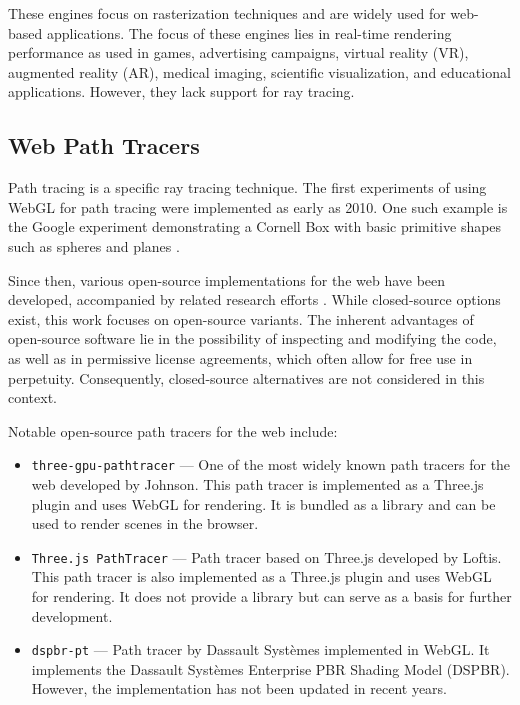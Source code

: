 These engines focus on rasterization techniques and are widely used for web-based applications. The focus of these engines lies in real-time rendering performance as used in games, advertising campaigns, virtual reality (VR), augmented reality (AR), medical imaging, scientific visualization, and educational applications. However, they lack support for ray tracing.

\subsection*{Web Path Tracers}
\label{sec:web-path-tracers}

Path tracing is a specific ray tracing technique. The first experiments of using \gls{WebGL} for path tracing were implemented as early as 2010. One such example is the Google experiment demonstrating a Cornell Box \cite{goral1984modeling} with basic primitive shapes such as spheres and planes \cite{pathTracerWallace}.

Since then, various open-source implementations for the web have been developed, accompanied by related research efforts \cite{academicWebGLPathTracer, academicWebGLPathTracer2}. While closed-source options exist, this work focuses on open-source variants. The inherent advantages of open-source software lie in the possibility of inspecting and modifying the code, as well as in permissive license agreements, which often allow for free use in perpetuity. Consequently, closed-source alternatives are not considered in this context.

Notable open-source path tracers for the web include:

\begin{itemize}
  \item{\texttt{three-gpu-pathtracer}} \cite{ThreeJsPathTracerJohnson} — One of the most widely known path tracers for the web developed by Johnson. This path tracer is implemented as a \gls{Three.js} plugin and uses \gls{WebGL} for rendering.  It is bundled as a library and can be used to render scenes in the browser.
  \item{\texttt{Three.js PathTracer}} \cite{ThreeJsPathTracerLoftis} — Path tracer based on \gls{Three.js} developed by Loftis. This path tracer is also implemented as a \gls{Three.js} plugin and uses \gls{WebGL} for rendering. It does not provide a library but can serve as a basis for further development.
  \item{\texttt{dspbr-pt}} \cite{PathTracerDassault} — Path tracer by Dassault Systèmes implemented in \gls{WebGL}. It implements the Dassault Systèmes Enterprise PBR Shading Model (\gls{DSPBR}). However, the implementation has not been updated in recent years.
\end{itemize}

